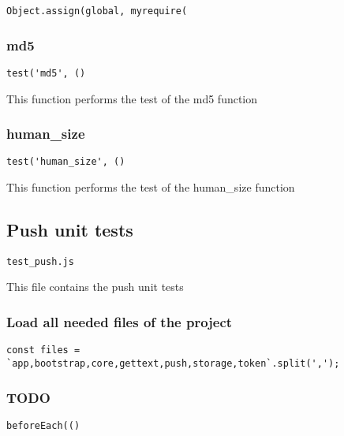 \documentclass[a4paper]{article}
\begin{document}
\begin{lstlisting}
Object.assign(global, myrequire(
\end{lstlisting}

\hypertarget{toc678}{}
\subsubsection{md5}

\begin{lstlisting}
test('md5', ()
\end{lstlisting}

This function performs the test of the md5 function

\hypertarget{toc679}{}
\subsubsection{human\_size}

\begin{lstlisting}
test('human_size', ()
\end{lstlisting}

This function performs the test of the human\_size function

\hypertarget{toc680}{}
\subsection{Push unit tests}

\begin{lstlisting}
test_push.js
\end{lstlisting}

This file contains the push unit tests

\hypertarget{toc681}{}
\subsubsection{Load all needed files of the project}

\begin{lstlisting}
const files = `app,bootstrap,core,gettext,push,storage,token`.split(',');
\end{lstlisting}

\hypertarget{toc682}{}
\subsubsection{TODO}

\begin{lstlisting}
beforeEach(()
\end{lstlisting}
\end{document}
